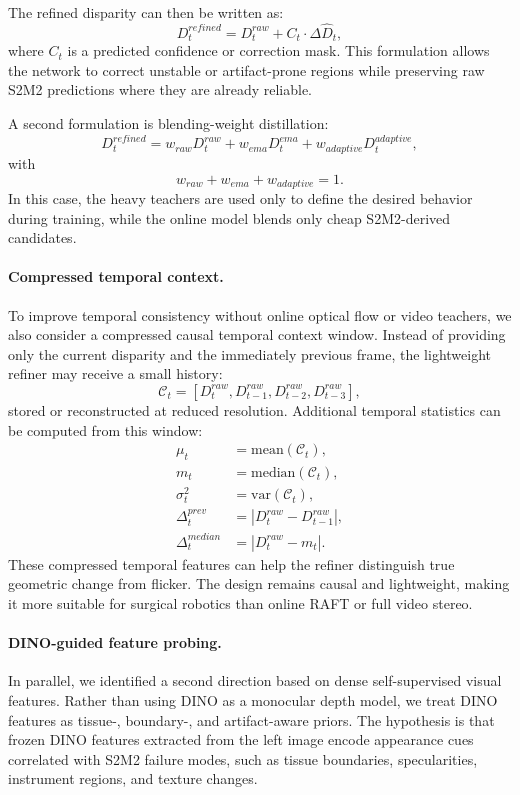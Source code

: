 \documentclass[11pt,a4paper]{article}
\begin{document}
The refined disparity can then be written as:
\[
D_t^{refined}
=
D_t^{raw} + C_t \cdot \Delta \hat{D}_t,
\]
where \(C_t\) is a predicted confidence or correction mask. This formulation
allows the network to correct unstable or artifact-prone regions while preserving
raw S2M2 predictions where they are already reliable.

A second formulation is blending-weight distillation:
\[
D_t^{refined}
=
w_{raw}D_t^{raw}
+
w_{ema}D_t^{ema}
+
w_{adaptive}D_t^{adaptive},
\]
with
\[
w_{raw} + w_{ema} + w_{adaptive} = 1.
\]
In this case, the heavy teachers are used only to define the desired behavior
during training, while the online model blends only cheap S2M2-derived
candidates.

\paragraph{Compressed temporal context.}
To improve temporal consistency without online optical flow or video teachers, we
also consider a compressed causal temporal context window. Instead of providing
only the current disparity and the immediately previous frame, the lightweight
refiner may receive a small history:
\[
\mathcal{C}_t =
\left[
D_t^{raw},
D_{t-1}^{raw},
D_{t-2}^{raw},
D_{t-3}^{raw}
\right],
\]
stored or reconstructed at reduced resolution. Additional temporal statistics
can be computed from this window:
\[
\begin{aligned}
\mu_t &= \mathrm{mean}(\mathcal{C}_t), \\
m_t &= \mathrm{median}(\mathcal{C}_t), \\
\sigma_t^2 &= \mathrm{var}(\mathcal{C}_t), \\
\Delta_t^{prev} &= |D_t^{raw} - D_{t-1}^{raw}|, \\
\Delta_t^{median} &= |D_t^{raw} - m_t|.
\end{aligned}
\]
These compressed temporal features can help the refiner distinguish true
geometric change from flicker. The design remains causal and lightweight, making
it more suitable for surgical robotics than online RAFT or full video stereo.

\paragraph{DINO-guided feature probing.}
In parallel, we identified a second direction based on dense self-supervised
visual features. Rather than using DINO as a monocular depth model, we treat DINO
features as tissue-, boundary-, and artifact-aware priors. The hypothesis is that
frozen DINO features extracted from the left image encode appearance cues
correlated with S2M2 failure modes, such as tissue boundaries, specularities,
instrument regions, and texture changes.
\end{document}
